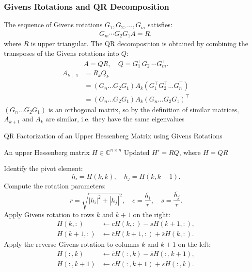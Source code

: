 \documentclass[12pt]{article}
\begin{document}
\subsubsection{Givens Rotations and QR Decomposition}

The sequence of Givens rotations $G_1, G_2, \dots, G_m$ satisfies:
\begin{align*}
G_m \cdots G_2 G_1 A = R,
\end{align*}
where \(R\) is upper triangular. The QR decomposition is obtained by combining the transposes of the Givens rotations into \(Q\):
\begin{align*}
A = Q R, \quad Q = G_1^{\top} G_2^{\top} \cdots G_m^{\top}.
\end{align*}
\begin{align*}
    A_{k+1}&= R_k Q_k\\
    &=(G_n \dots G_2 G_1)A_k(G_1^{\top}G_2^{\top}\dots G_n^{\top})\\
    &= (G_n \dots G_2 G_1)A_k(G_n \dots G_2 G_1)^{\top}
\end{align*}
$(G_n \dots G_2 G_1)$ is an orthogonal matrix, so by the definition of similar matrices, $A_{k+1}$ and $A_k$ are similar, i.e. they have the same eigenvalues\\
\begin{algorithm}[H]
\caption{QR Factorization of an Upper Hessenberg Matrix using Givens Rotations}
\begin{algorithmic}[1]
\REQUIRE An upper Hessenberg matrix \( H \in \mathbb{C}^{n \times n} \)
\ENSURE Updated \( H' = RQ \), where \( H = QR \)

    \STATE Identify the pivot element:
    \[
    h_i = H(k,k), \quad h_j = H(k,k+1).
    \]
    \STATE Compute the rotation parameters:
    \[
    r = \sqrt{|h_i|^2 + |h_j|^2}, \quad c = \frac{\overline{h_i}}{r}, \quad s = \frac{\overline{h_j}}{r}.
    \]
    \STATE Apply Givens rotation to rows \( k \) and \( k+1 \) on the right:
    \begin{align*}
    H(k, :) &\gets c H(k, :) - s H(k+1, :), \\
    H(k+1, :) &\gets \overline{c} H(k+1, :) + \overline{s} H(k, :).
    \end{align*}
        \STATE Apply the reverse Givens rotation to columns \( k \) and \( k+1 \) on the left:
    \begin{align*}
    H(:, k) &\gets \overline{c} H(:, k) - \overline{s} H(:, k+1), \\
    H(:, k+1) &\gets c H(:, k+1) + s H(:, k).
    \end{align*}
\ENDFOR

\end{algorithmic}
\end{algorithm}
\end{document}
